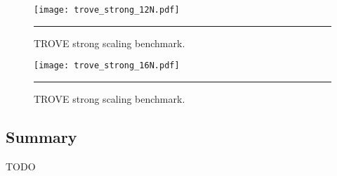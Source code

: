 \documentclass[10pt]{article}
\begin{document}
\begin{figure*}[h!]
	\centering
	\texttt{[image: trove\_strong\_12N.pdf]}
	\vspace{0.1cm}
	\hrule
	\vspace{0.01cm}
	\caption{TROVE strong scaling benchmark.}
	\label{fig::trove_ss_12N}
\end{figure*}

\begin{figure*}[h!]
	\centering
	\texttt{[image: trove\_strong\_16N.pdf]}
	\vspace{0.1cm}
	\hrule
	\vspace{0.01cm}
	\caption{TROVE strong scaling benchmark.}
	\label{fig::trove_ss_16N}
\end{figure*}


\clearpage
\subsection{Summary}

{\color{red} TODO}
\end{document}

